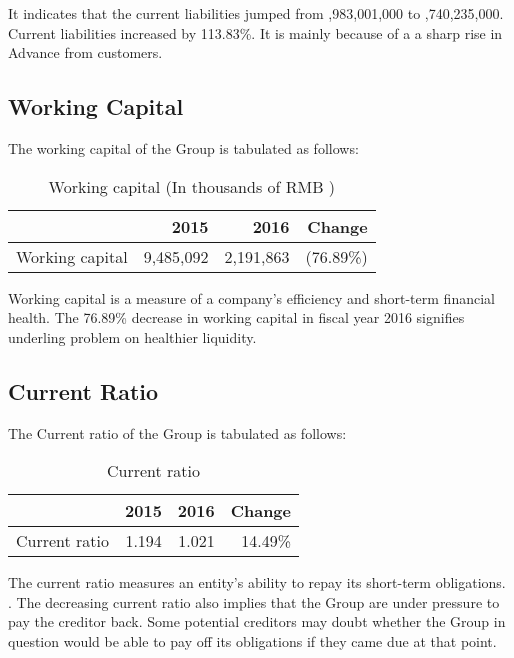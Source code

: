 It indicates that the current liabilities jumped from ,983,001,000 to ,740,235,000. Current liabilities increased by 113.83\%. It is mainly because of a a sharp rise in Advance from customers.
	
\subsection{Working Capital}
The working capital of the Group is tabulated as follows:
\begin{table}[H]	
	\begin{center}
		\begin{tabular}{lrrr}
			\toprule
			&\textbf{2015}&\textbf{2016}&\textbf{Change}\\
			\midrule
			Working capital&9,485,092&2,191,863&(76.89\%)\\
			\bottomrule
		\end{tabular}
	\end{center}
	\caption{Working capital (In thousands of RMB \textyen)}\label{table:1}
\end{table}

Working capital is a measure of a company’s efficiency and short-term financial health. The 76.89\% decrease in working capital in fiscal year 2016 signifies underling problem on healthier liquidity.

\subsection{Current Ratio}
The Current ratio of the Group is tabulated as follows:
\begin{table}[H]	
	\begin{center}
		\begin{tabular}{lrrr}
			\toprule
			&\textbf{2015}&\textbf{2016}&\textbf{Change}\\
			\midrule
			Current ratio&1.194&1.021&14.49\%\\
			\bottomrule
		\end{tabular}
	\end{center}
	\caption{Current ratio}\label{table:1}
\end{table}

The current ratio measures an entity’s ability to repay its short-term obligations. .
The decreasing current ratio also implies that the Group are under pressure to pay the creditor back. Some potential creditors may doubt whether the Group in question would be able to pay off its obligations if they came due at that point. 



